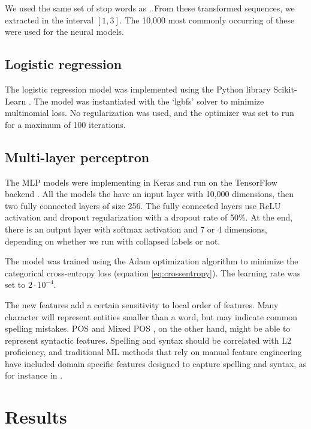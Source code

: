 We used the same set of stop words as \citeauthor{malmasi15}. From these
transformed sequences, we extracted \ngrams in the interval $[1,3]$. The
10,000 most commonly occurring of these were used for the neural models.


\subsection{Logistic regression}

The logistic regression model was implemented using the Python library
Scikit-Learn \autocite{scikit-learn}. The model was instantiated with the
`lgbfs' solver to minimize multinomial loss. No regularization was used, and
the optimizer was set to run for a maximum of 100 iterations.


\subsection{Multi-layer perceptron}
\label{subsec:mlp}

The MLP models were implementing in Keras \autocite{keras} and run on the
TensorFlow backend \autocite{tensorflow}. All the models the have an input
layer with 10,000 dimensions, then two fully connected layers of size 256.
The fully connected layers use \ac{ReLU} activation and dropout
regularization with a dropout rate of 50\%. At the end, there is an output
layer with softmax activation and 7 or 4 dimensions, depending on whether we
run with collapsed labels or not.

The model was trained using the Adam optimization algorithm
\autocite{kingma2014adam} to minimize the categorical cross-entropy loss
(equation \ref{eq:crossentropy}). The learning rate was set to $2\cdot
10^{-4}$.


The new \ngram features add a certain sensitivity to local order of features.
Many character \ngrams will represent entities smaller than a word, but may
indicate common spelling mistakes. \ac{POS} and Mixed POS \ngrams, on the
other hand, might be able to represent syntactic features. Spelling and
syntax should be correlated with L2 proficiency, and traditional \ac{ML}
methods that rely on manual feature engineering have included domain specific
features designed to capture spelling and syntax, as for instance in
\textcite{vajjala17}.


\section{Results}

